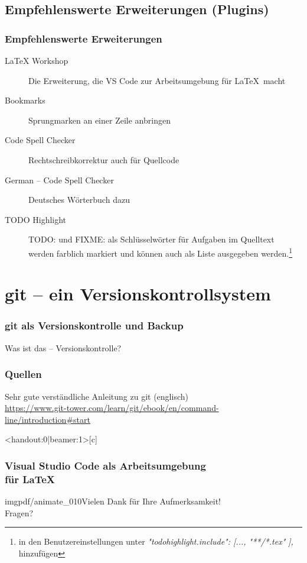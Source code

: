 \documentclass[t, %
							xcolor=dvipsnames,%
							hyperref={bookmarks,colorlinks},%
							]%
							{beamer}
\begin{document}
		\subsection{Empfehlenswerte Erweiterungen (Plugins)}
		\label{sub:EmpfehlenswerteErweiterungen}
		\begin{frame}
			\frametitle{Empfehlenswerte Erweiterungen}
			\begin{description}
				\item[LaTeX Workshop] Die Erweiterung, die VS Code zur Arbeitsumgebung für \LaTeX\ macht
				\item[Bookmarks] Sprungmarken an einer Zeile anbringen
				\item[Code Spell Checker] Rechtschreibkorrektur auch für Quellcode
				\item[German – Code Spell Checker]Deutsches Wörterbuch dazu
				\item[TODO Highlight] TODO: und FIXME: als Schlüsselwörter für Aufgaben im Quelltext werden farblich markiert und können auch als Liste ausgegeben werden.\footnote{in den Benutzereinstellungen unter \emph{"todohighlight.include": [...,					
					"**/*.tex"
			],} hinzufügen}
			\end{description}
		\end{frame}
	
	\section{git – ein Versionskontrollsystem}
	\label{sec:git-vcs}
	\begin{frame}
		\frametitle{git als Versionskontrolle und Backup}
		Was ist das – Versionskontrolle?
	\end{frame}

	\begin{frame}
		\frametitle{Quellen}
		Sehr gute verständliche Anleitung zu git (englisch)\\
		\url{https://www.git-tower.com/learn/git/ebook/en/command-line/introduction\#start}
	\end{frame}
	
%
		\begin{frame}<handout:0|beamer:1>[c]
		    \frametitle{Visual Studio Code als Arbeitsumgebung \\für \LaTeX}
								{imgpdf/animate_}{0}{10}\Large{Vielen Dank für Ihre Aufmerksamkeit!}\\[1.2\baselineskip]
				\centering
				\Huge{Fragen?}
		\end{frame}
\end{document}
